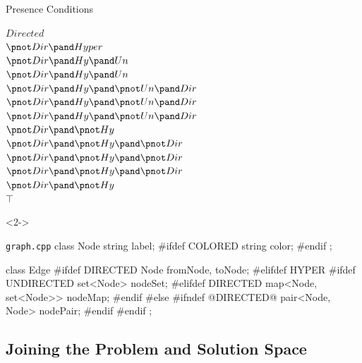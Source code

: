 \begin{frame}[b,fragile]{\myframetitle}
\begin{fancycolumns}[t,columns=3,widths={40,23,37},animation=none]
{\begin{exampletight}{Presence Conditions}
\begin{flushright}
				{\color{gray}$Directed$}\\
				{\color{gray}$\pnot Dir \pand Hyper$}\\
				{\color{gray}$\pnot Dir \pand Hy \pand Un$}\\
				{\color{gray}$\pnot Dir \pand Hy \pand Un$}\\
				{\color{gray}$\pnot Dir \pand Hy \pand \pnot Un \pand Dir$}\\
				{\color{gray}$\pnot Dir \pand Hy \pand \pnot Un \pand Dir$}\\
				{\color{gray}$\pnot Dir \pand Hy \pand \pnot Un \pand Dir$}\\
				{\color{lecturegreen}$\pnot Dir \pand \pnot Hy$}\\
				{\color{lecturered}$\pnot Dir \pand \pnot Hy \pand \pnot Dir$}\\
				{\color{lecturered}$\pnot Dir \pand \pnot Hy \pand \pnot Dir$}\\
				{\color{lecturered}$\pnot Dir \pand \pnot Hy \pand \pnot Dir$}\\
				{\color{lecturegreen}$\pnot Dir \pand \pnot Hy$}\\
				{\color{gray}$\top$}
			\end{flushright}
		\end{exampletight}
	}
	\nextcolumn
		\begin{uncoverenv}<2->
			\begin{cpptight}[basicstyle=\small]{\texttt{graph.cpp}}
class Node {
	string label;
#ifdef COLORED
	string color;
#endif
};

class Edge {
#ifdef DIRECTED
	Node fromNode, toNode;
#elifdef HYPER
#ifdef UNDIRECTED
	set<Node> nodeSet;
#elifdef DIRECTED
	map<Node, set<Node>> nodeMap;
#endif
#else
#ifndef @DIRECTED@
	pair<Node, Node> nodePair;
#endif
#endif
};
			\end{cpptight}
		\end{uncoverenv}
	\end{fancycolumns}
\end{frame}

\subsection{Joining the Problem and Solution Space}

